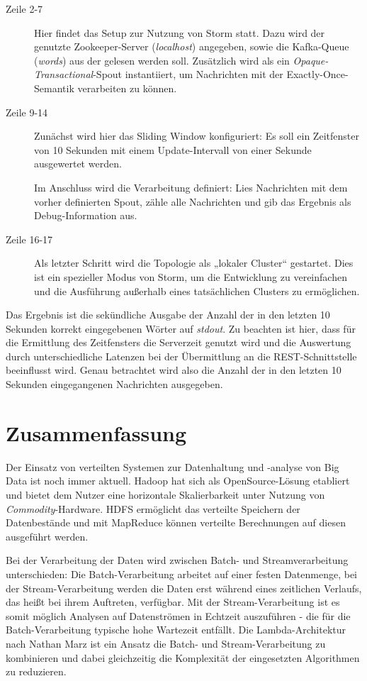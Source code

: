 \documentclass[a4paper,11pt]{scrartcl}
\begin{document}
  \begin{description}
    \item[Zeile 2-7] Hier findet das Setup zur Nutzung von Storm statt. Dazu
      wird der genutzte Zookeeper-Server (\textit{localhost}) angegeben, sowie
      die Kafka-Queue (\textit{words}) aus der gelesen werden soll. Zusätzlich
      wird als ein \textit{Opaque-Transactional}-Spout instantiiert, um
      Nachrichten mit der Exactly-Once-Semantik verarbeiten zu können.
    \item[Zeile 9-14] Zunächst wird hier das Sliding Window konfiguriert: Es
      soll ein Zeitfenster von 10 Sekunden mit einem Update-Intervall von einer
      Sekunde ausgewertet werden. 
      
      Im Anschluss wird die Verarbeitung definiert: Lies Nachrichten mit dem
      vorher definierten Spout, zähle alle Nachrichten und gib das Ergebnis als
      Debug-Information aus.
    \item[Zeile 16-17] Als letzter Schritt wird die Topologie als „lokaler
      Cluster“ gestartet. Dies ist ein spezieller Modus von Storm, um die
      Entwicklung zu vereinfachen und die Ausführung außerhalb eines
      tatsächlichen Clusters zu ermöglichen.
  \end{description}

  Das Ergebnis ist die sekündliche Ausgabe der Anzahl der in den letzten 10
  Sekunden korrekt eingegebenen Wörter auf \textit{stdout}. Zu beachten ist
  hier, dass für die Ermittlung des Zeitfensters die Serverzeit genutzt wird
  und die Auswertung durch unterschiedliche Latenzen bei der Übermittlung an
  die REST-Schnittstelle beeinflusst wird. Genau betrachtet wird also die
  Anzahl der in den letzten 10 Sekunden eingegangenen Nachrichten ausgegeben.

  \section{Zusammenfassung}
  Der Einsatz von verteilten Systemen zur Datenhaltung und -analyse von Big
  Data ist noch immer aktuell. Hadoop hat sich als OpenSource-Lösung etabliert
  und bietet dem Nutzer eine horizontale Skalierbarkeit unter Nutzung von
  \textit{Commodity}-Hardware. HDFS ermöglicht das verteilte Speichern der
  Datenbestände und mit MapReduce können verteilte Berechnungen auf diesen
  ausgeführt werden.

  Bei der Verarbeitung der Daten wird zwischen Batch- und Streamverarbeitung
  unterschieden: Die Batch-Verarbeitung arbeitet auf einer festen Datenmenge,
  bei der Stream-Verarbeitung werden die Daten erst während eines zeitlichen
  Verlaufs, das heißt bei ihrem Auftreten, verfügbar. Mit der
  Stream-Verarbeitung ist es somit möglich Analysen auf Datenströmen in
  Echtzeit auszuführen - die für die Batch-Verarbeitung typische hohe Wartezeit
  entfällt. Die Lambda-Architektur nach Nathan Marz ist ein Ansatz die Batch-
  und Stream-Verarbeitung zu kombinieren und dabei gleichzeitig die Komplexität
  der eingesetzten Algorithmen zu reduzieren. 
\end{document}
